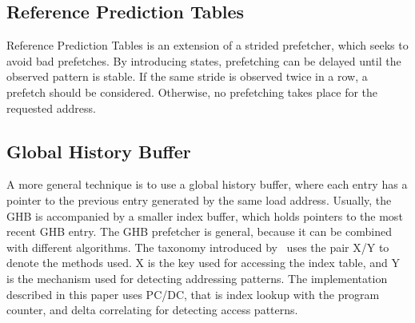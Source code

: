 \subsection{Reference Prediction Tables}

Reference Prediction Tables is an extension of a strided prefetcher,
which seeks to avoid bad prefetches. By introducing states,
prefetching can be delayed until the observed pattern is stable. If
the same stride is observed twice in a row, a prefetch should be
considered. Otherwise, no prefetching takes place for the requested
address.

\subsection{Global History Buffer}

A more general technique is to use a global history buffer, where each
entry has a pointer to the previous entry generated by the same load
address. Usually, the GHB is accompanied by a smaller index buffer,
which holds pointers to the most recent GHB entry. The GHB prefetcher
is general, because it can be combined with different algorithms. The
taxonomy introduced by~\cite{nesbit_smith_2005} uses the pair X/Y to
denote the methods used. X is the key used for accessing the index
table, and Y is the mechanism used for detecting addressing
patterns. The implementation described in this paper uses PC/DC, that
is index lookup with the program counter, and delta correlating for
detecting access patterns.

